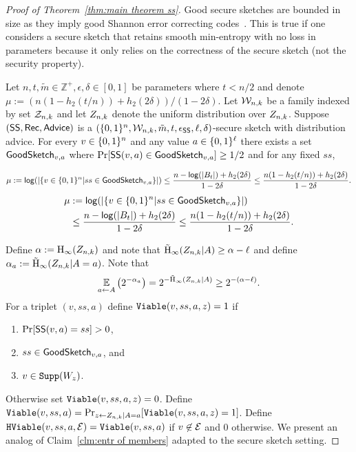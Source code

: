 \begin{proof}[Proof of Theorem~\ref{thm:main theorem ss}]

Good secure sketches are bounded in size as they imply good Shannon error correcting codes~\cite[Lemma 7.3]{fuller2020fuzzy}.  This  is true if one considers a secure sketch that retains smooth min-entropy with no loss in parameters because it only relies on the correctness of the secure sketch (not the security property).  

\begin{lemma}
\label{lem:smallgeneralviable ss}
Let $ n, t,\tilde{m}\in\mathbb{Z}^+, \epsilon, \delta\in[0,1]$ be parameters where $t<n/2$ and denote $\mu :=(n(1-h_2(t/n)) +h_2(2\delta))/(1-2\delta)$.
Let $\mathcal{W}_{n,k}$ be a family indexed by set $\mathcal{Z}_{n,k}$ and let $Z_{n,k}$ denote the uniform distribution over $Z_{n,k}$.  Suppose $({\mathsf{SS}}, {\mathsf{Rec}}, {\mathsf{Advice}})$ is a $(\{0, 1\}^n, \mathcal{W}_{n,k}, \tilde{m}, t, \epsilon_{\mathsf{SS}}, \ell, \delta)$-secure sketch with distribution advice. 
   For every $v\in \{0, 1\}^n$ and any value $a \in \{0, 1\}^\ell$ there exists a set $\mathsf{GoodSketch}_{v,a}$ where $\Pr[{\mathsf{SS}}(v, a)\in \mathsf{GoodSketch}_{v,a}] \ge 1/2$ and for any fixed $ss$,
    
 \ifnum{}
    \[
   \mu:= \mathsf{log}\!\left(|\{v \in \{0, 1\}^n | ss \in \mathsf{GoodSketch}_{v,a}\}|\right) \le \frac{n - \mathsf{log}\!\left(|B_t|\right) +h_2(2\delta)}{1-2\delta} \le \frac{n(1-h_2(t/n)) +h_2(2\delta)}{1-2\delta}.
    \]
    \else
    \begin{align*}
   \mu&:= \mathsf{log}\!\left(|\{v \in \{0, 1\}^n | ss \in \mathsf{GoodSketch}_{v,a}\}|\right) \\&\le \frac{n - \mathsf{log}\!\left(|B_t|\right) +h_2(2\delta)}{1-2\delta} \le \frac{n(1-h_2(t/n)) +h_2(2\delta)}{1-2\delta}.    
    \end{align*}
    \fi
\end{lemma}

\noindent
Define $\alpha :=\mathrm{H}_\infty(Z_{n,k})$ and note that $\tilde{\mathrm{H}}_\infty(Z_{n,k}|A)\ge \alpha-\ell$ and define $\alpha_a:=\tilde{\mathrm{H}}_\infty(Z_{n,k}|A=a)$.
 Note that \[\operatorname*{\mathbb{E}}_{a\leftarrow A} \left(2^{-\alpha_a} \right) =2^{-\tilde{\mathrm{H}}_\infty(Z_{n,k}|A)}\ge 2^{-(\alpha-\ell)}.\] 
For a triplet $(v, ss, a)$ define $\mathtt{Viable}(v, ss, a, z)=1$ if 
\begin{enumerate}
\item $\Pr[{\mathsf{SS}}(v, a) = ss]>0$,
\item $ss\in\mathsf{GoodSketch}_{v,a}$, and 
\item $v\in\mathtt{Supp}(W_z)$.
\end{enumerate} Otherwise set $\mathtt{Viable}(v, ss, a, z)=0$.  Define $\mathtt{Viable}(v, ss, a) = \Pr_{z\leftarrow Z_{n,k}|A=a}[\mathtt{Viable}(v,ss,a,z)=1]$. Define $\mathtt{HViable}(v, ss, a, \mathcal{E}) = \mathtt{Viable}(v,ss, a)$ if $v\not\in \mathcal{E}$ and $0$ otherwise.
We present an analog of Claim~\ref{clm:entr of members} adapted to the secure sketch setting. 


\end{proof}

